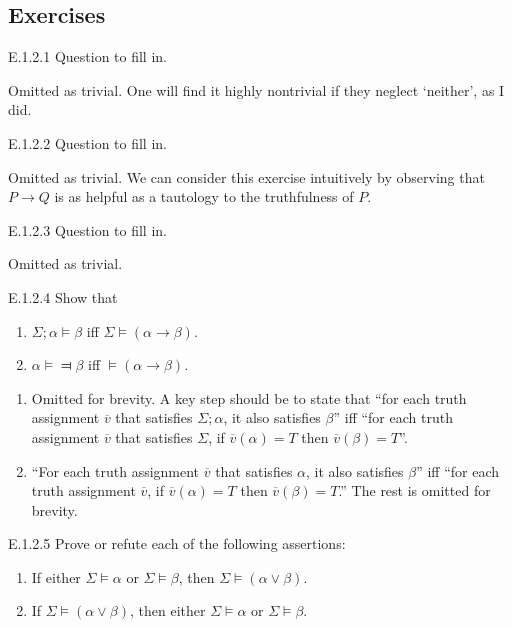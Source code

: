 \subsection*{Exercises}

\begin{exercise}{E.1.2.1}
  Question to fill in.
\end{exercise}

Omitted as trivial. One will find it highly nontrivial if they neglect `neither', as I did.

\begin{exercise}{E.1.2.2}
  Question to fill in.
\end{exercise}

Omitted as trivial. We can consider this exercise intuitively by observing that $P \rightarrow Q$ is as helpful as a tautology to the truthfulness of $P$.

\begin{exercise}{E.1.2.3}
  Question to fill in.
\end{exercise}

Omitted as trivial.

\begin{exercise}{E.1.2.4}
  Show that \begin{enumerate}[label=(\alph*)]
    \item $\Sigma;\alpha\vDash \beta$ iff $\Sigma\vDash(\alpha\rightarrow \beta)$.
    \item $\alpha\vDash\Dashv \beta$ iff $\vDash(\alpha\rightarrow \beta)$.\qedhere
  \end{enumerate}
\end{exercise}

\begin{enumerate}[label=(\alph*)]
  \item Omitted for brevity. A key step should be to state that ``for each truth assignment $\overline{v}$ that satisfies $\Sigma;\alpha$, it also satisfies $\beta$'' iff ``for each truth assignment $\overline{v}$ that satisfies $\Sigma$, if $\overline{v}(\alpha)=T$ then $\overline{v}(\beta)=T$''.
  \item ``For each truth assignment $\overline{v}$ that satisfies $\alpha$, it also satisfies $\beta$'' iff ``for each truth assignment $\overline{v}$, if $\overline{v}(\alpha)=T$ then $\overline{v}(\beta)=T$.'' The rest is omitted for brevity.
\end{enumerate}

\begin{exercise}{E.1.2.5}
  Prove or refute each of the following assertions:
  \begin{enumerate}[label=(\alph*)]
    \item If either $\Sigma \vDash \alpha$ or $\Sigma \vDash \beta$, then $\Sigma \vDash (\alpha \lor \beta)$.
    \item If $\Sigma \vDash (\alpha \lor \beta)$, then either $\Sigma \vDash \alpha$ or $\Sigma \vDash \beta$.\qedhere
  \end{enumerate}
\end{exercise}

